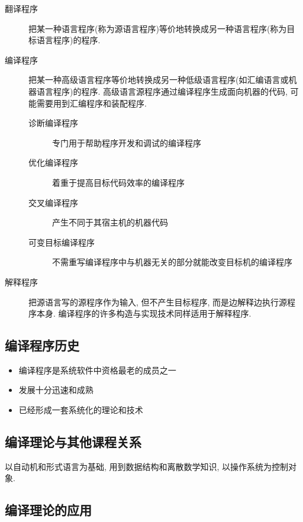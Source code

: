     \begin{description}
        \item[翻译程序]    把某一种语言程序(称为\textsf{源语言程序})等价地转换成另一种语言程序(称为\textsf{目标语言程序})的程序.

        \item[编译程序]    把某一种高级语言程序等价地转换成另一种低级语言程序(如汇编语言或机器语言程序)的程序. 高级语言源程序通过编译程序生成面向机器的代码, 可能需要用到汇编程序和装配程序.

            \begin{description}
                \item[诊断编译程序] 专门用于帮助程序开发和调试的编译程序
                \item[优化编译程序] 着重于提高目标代码效率的编译程序
                \item[交叉编译程序] 产生不同于其宿主机的机器代码
                \item[可变目标编译程序] 不需重写编译程序中与机器无关的部分就能改变目标机的编译程序
            \end{description}

        \item[解释程序]    把源语言写的源程序作为输入, 但不产生目标程序, 而是边解释边执行源程序本身. 编译程序的许多构造与实现技术同样适用于解释程序.
    \end{description}

    \subsection{编译程序历史}

        \begin{itemize}
            \item 编译程序是系统软件中资格最老的成员之一
            \item 发展十分迅速和成熟
            \item 已经形成一套系统化的理论和技术
        \end{itemize}

    \subsection{编译理论与其他课程关系}

        以自动机和形式语言为基础, 用到数据结构和离散数学知识, 以操作系统为控制对象.

    \subsection{编译理论的应用}

